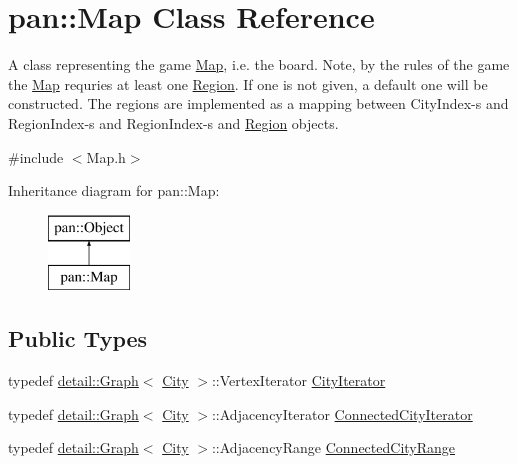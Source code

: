 \hypertarget{classpan_1_1_map}{}\section{pan\+:\+:Map Class Reference}
\label{classpan_1_1_map}


A class representing the game \hyperlink{classpan_1_1_map}{Map}, i.\+e. the board. Note, by the rules of the game the \hyperlink{classpan_1_1_map}{Map} requries at least one \hyperlink{classpan_1_1_region}{Region}. If one is not given, a default one will be constructed. The regions are implemented as a mapping between City\+Index-\/s and Region\+Index-\/s and Region\+Index-\/s and \hyperlink{classpan_1_1_region}{Region} objects.  




{\ttfamily \#include $<$Map.\+h$>$}

Inheritance diagram for pan\+:\+:Map\+:\begin{figure}[H]
\begin{center}
\leavevmode
\includegraphics[height=2.000000cm]{classpan_1_1_map}
\end{center}
\end{figure}
\subsection*{Public Types}
\begin{DoxyCompactItemize}
\item 
typedef \hyperlink{classpan_1_1detail_1_1_graph}{detail\+::\+Graph}$<$ \hyperlink{classpan_1_1_city}{City} $>$\+::Vertex\+Iterator \hyperlink{classpan_1_1_map_a13baf12f486c6c3b823696266f06202c}{City\+Iterator}
\item 
typedef \hyperlink{classpan_1_1detail_1_1_graph}{detail\+::\+Graph}$<$ \hyperlink{classpan_1_1_city}{City} $>$\+::Adjacency\+Iterator \hyperlink{classpan_1_1_map_a616bc40b1a3f76f046be7ddf44ba90df}{Connected\+City\+Iterator}
\item 
typedef \hyperlink{classpan_1_1detail_1_1_graph}{detail\+::\+Graph}$<$ \hyperlink{classpan_1_1_city}{City} $>$\+::Adjacency\+Range \hyperlink{classpan_1_1_map_a6b1e81229ca2ed5c67202254948bde9b}{Connected\+City\+Range}
\end{DoxyCompactItemize}
